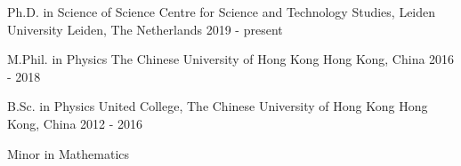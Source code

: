 

\begin{cventries}

  \cventry
    {Ph.D. in Science of Science} %
    {Centre for Science and Technology Studies, Leiden University} %
    {Leiden, The Netherlands} %
    {2019 - present} %
    {}

  \cventry
    {M.Phil. in Physics} %
    {The Chinese University of Hong Kong} %
    {Hong Kong, China} %
    {2016 - 2018} %
    {}

  \cventry
    {B.Sc. in Physics} %
    {United College, The Chinese University of Hong Kong} %
    {Hong Kong, China} %
    {2012 - 2016} %
    {
      \begin{cvitems} %
        \item {Minor in Mathematics}
      \end{cvitems}
    }

\end{cventries}
